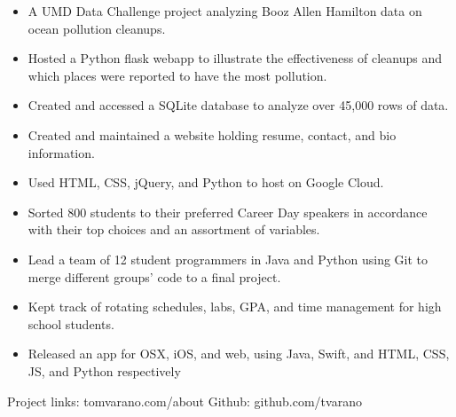 \documentclass[11pt]{article}
\begin{document}
\vspace{2mm}
{\fontsize{10}{12}\robotocondlight
\begin{itemize}[noitemsep,nolistsep]
    \item A UMD Data Challenge project analyzing Booz Allen Hamilton data on ocean pollution cleanups. 
    \item Hosted a {\robotocond Python flask} webapp to illustrate the effectiveness of cleanups and which places were reported to have the most pollution. 
    \item Created and accessed a {\robotocond SQLite} database to analyze over 45,000 rows of data.
\end{itemize}
{\fontsize{10}{12}\robotocondlight
\begin{itemize}[noitemsep,nolistsep]
    \item Created and maintained a website holding resume, contact, and bio information.
    \item Used {\robotocond HTML}, {\robotocond CSS}, {\robotocond jQuery}, and {\robotocond Python} to host on {\robotocond Google Cloud}.
\end{itemize}
\begin{itemize}[noitemsep,nolistsep]
    \item Sorted 800 students to their preferred Career Day speakers in accordance with their top choices and an assortment of variables.
    \item Lead a team of 12 student programmers in {\robotocond Java} and {\robotocond Python} using {\robotocond Git} to merge different groups’ code to a final project.
\end{itemize}
\begin{itemize}[noitemsep,nolistsep]
    \item Kept track of rotating schedules, labs, GPA, and time management for high school students. 
    \item Released an app for OSX, iOS, and web, using {\robotocond Java}, {\robotocond Swift},
     and {\robotocond HTML}, {\robotocond CSS}, {\robotocond JS}, and {\robotocond Python} respectively
\end{itemize}
{\fontsize{8}{10}\robotocondlight Project links: tomvarano.com/about \hfill Github: github.com/tvarano
}
\hsep
}}
\end{document}
